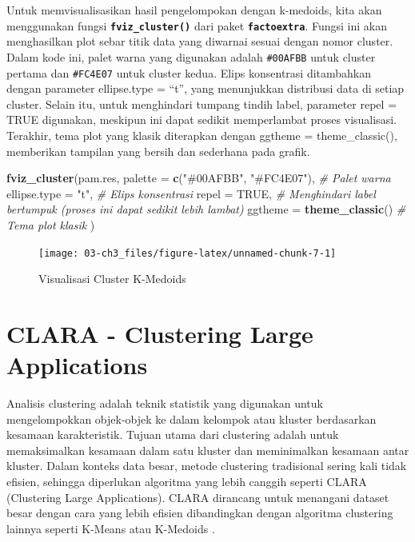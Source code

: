 \documentclass[
  oneside]{book}
\newenvironment{Shaded}{\begin{snugshade}}{\end{snugshade}}
\newcommand{\AttributeTok}[1]{\textcolor[rgb]{0.13,0.29,0.53}{#1}}
\newcommand{\CommentTok}[1]{\textcolor[rgb]{0.56,0.35,0.01}{\textit{#1}}}
\newcommand{\ConstantTok}[1]{\textcolor[rgb]{0.56,0.35,0.01}{#1}}
\newcommand{\FunctionTok}[1]{\textcolor[rgb]{0.13,0.29,0.53}{\textbf{#1}}}
\newcommand{\NormalTok}[1]{#1}
\newcommand{\StringTok}[1]{\textcolor[rgb]{0.31,0.60,0.02}{#1}}
\begin{document}
Untuk memvisualisasikan hasil pengelompokan dengan k-medoids, kita akan menggunakan fungsi \textbf{\texttt{fviz\_cluster()}} dari paket \textbf{\texttt{factoextra}}. Fungsi ini akan menghasilkan plot sebar titik data yang diwarnai sesuai dengan nomor cluster. Dalam kode ini, palet warna yang digunakan adalah \texttt{\#00AFBB} untuk cluster pertama dan \texttt{\#FC4E07} untuk cluster kedua. Elips konsentrasi ditambahkan dengan parameter ellipse.type = ``t'', yang menunjukkan distribusi data di setiap cluster. Selain itu, untuk menghindari tumpang tindih label, parameter repel = TRUE digunakan, meskipun ini dapat sedikit memperlambat proses visualisasi. Terakhir, tema plot yang klasik diterapkan dengan ggtheme = theme\_classic(), memberikan tampilan yang bersih dan sederhana pada grafik.

\begin{Shaded}
\begin{Highlighting}[]
\FunctionTok{fviz\_cluster}\NormalTok{(pam.res,}
  \AttributeTok{palette =} \FunctionTok{c}\NormalTok{(}\StringTok{"\#00AFBB"}\NormalTok{, }\StringTok{"\#FC4E07"}\NormalTok{), }\CommentTok{\# Palet warna}
  \AttributeTok{ellipse.type =} \StringTok{"t"}\NormalTok{, }\CommentTok{\# Elips konsentrasi}
  \AttributeTok{repel =} \ConstantTok{TRUE}\NormalTok{, }\CommentTok{\# Menghindari label bertumpuk (proses ini dapat sedikit lebih lambat)}
  \AttributeTok{ggtheme =} \FunctionTok{theme\_classic}\NormalTok{() }\CommentTok{\# Tema plot klasik}
\NormalTok{)}
\end{Highlighting}
\end{Shaded}

\begin{figure}[h]

{\centering \texttt{[image: 03-ch3\_files/figure-latex/unnamed-chunk-7-1]} 

}

\caption{Visualisasi Cluster K-Medoids}\label{fig:unnamed-chunk-7}
\end{figure}

\chapter{CLARA - Clustering Large Applications}\label{clra}

Analisis clustering adalah teknik statistik yang digunakan untuk
mengelompokkan objek-objek ke dalam kelompok atau kluster berdasarkan
kesamaan karakteristik. Tujuan utama dari clustering adalah untuk
memaksimalkan kesamaan dalam satu kluster dan meminimalkan kesamaan
antar kluster. Dalam konteks data besar, metode clustering tradisional
sering kali tidak efisien, sehingga diperlukan algoritma yang lebih
canggih seperti CLARA (Clustering Large Applications). CLARA dirancang
untuk menangani dataset besar dengan cara yang lebih efisien
dibandingkan dengan algoritma clustering lainnya seperti K-Means atau
K-Medoids \citep{kaufman1990finding}.
\end{document}
